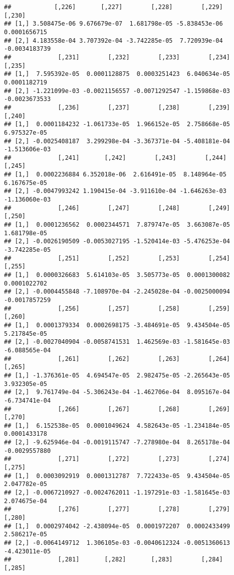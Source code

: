 \documentclass[
]{article}
\begin{document}
\begin{verbatim}
##            [,226]       [,227]        [,228]        [,229]        [,230]
## [1,] 3.508475e-06 9.676679e-07  1.681798e-05 -5.838453e-06  0.0001656715
## [2,] 4.183558e-04 3.707392e-04 -3.742285e-05  7.720939e-04 -0.0034183739
##             [,231]        [,232]        [,233]        [,234]        [,235]
## [1,]  7.595392e-05  0.0001128875  0.0003251423  6.040634e-05  0.0001182719
## [2,] -1.221099e-03 -0.0021156557 -0.0071292547 -1.159868e-03 -0.0023673533
##             [,236]        [,237]        [,238]        [,239]        [,240]
## [1,]  0.0001184232 -1.061733e-05  1.966152e-05  2.758668e-05  6.975327e-05
## [2,] -0.0025408187  3.299298e-04 -3.367371e-04 -5.408181e-04 -1.513606e-03
##             [,241]       [,242]        [,243]        [,244]        [,245]
## [1,]  0.0002236884 6.352018e-06  2.616491e-05  8.148964e-05  6.167675e-05
## [2,] -0.0047993242 1.190415e-04 -3.911610e-04 -1.646263e-03 -1.136060e-03
##             [,246]        [,247]        [,248]        [,249]        [,250]
## [1,]  0.0001236562  0.0002344571  7.879747e-05  3.663087e-05  1.681798e-05
## [2,] -0.0026190509 -0.0053027195 -1.520414e-03 -5.476253e-04 -3.742285e-05
##             [,251]        [,252]        [,253]        [,254]        [,255]
## [1,]  0.0000326683  5.614103e-05  3.505773e-05  0.0001300082  0.0001022702
## [2,] -0.0004455848 -7.108970e-04 -2.245028e-04 -0.0025000094 -0.0017857259
##             [,256]        [,257]        [,258]        [,259]        [,260]
## [1,]  0.0001379334  0.0002698175 -3.484691e-05  9.434504e-05  5.217845e-05
## [2,] -0.0027040904 -0.0058741531  1.462569e-03 -1.581645e-03 -6.088565e-04
##             [,261]        [,262]        [,263]        [,264]        [,265]
## [1,] -1.376361e-05  4.694547e-05  2.982475e-05 -2.265643e-05  3.932305e-05
## [2,]  9.761749e-04 -5.306243e-04 -1.462706e-04  8.095167e-04 -6.734741e-04
##             [,266]        [,267]        [,268]        [,269]        [,270]
## [1,]  6.152538e-05  0.0001049624  4.582643e-05 -1.234184e-05  0.0001433178
## [2,] -9.625946e-04 -0.0019115747 -7.278980e-04  8.265178e-04 -0.0029557880
##             [,271]        [,272]        [,273]        [,274]       [,275]
## [1,]  0.0003092919  0.0001312787  7.722433e-05  9.434504e-05 2.047782e-05
## [2,] -0.0067210927 -0.0024762011 -1.197291e-03 -1.581645e-03 2.074675e-04
##             [,276]        [,277]        [,278]        [,279]        [,280]
## [1,]  0.0002974042 -2.438094e-05  0.0001972207  0.0002433499  2.586217e-05
## [2,] -0.0064149712  1.306105e-03 -0.0040612324 -0.0051360613 -4.423011e-05
##             [,281]       [,282]       [,283]        [,284]        [,285]

\end{verbatim}
\end{document}
